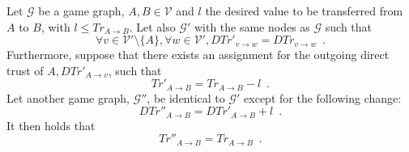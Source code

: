 {}
\begin{theorem}
\label{riskinv}
  Let $\mathcal{G}$ be a game graph, $A, B \in \mathcal{V}$ and $l$ the desired value to be transferred from $A$ to $B$, with
  $l \leq Tr_{A \rightarrow B}$. Let also $\mathcal{G}'$ with the same nodes as $\mathcal{G}$ such that
  \begin{equation*}
    \forall v \in \mathcal{V}' \setminus \{A\}, \forall w \in \mathcal{V}', DTr'_{v \rightarrow w} =
    DTr_{v \rightarrow w} \enspace.
  \end{equation*}
  Furthermore, suppose that there exists an assignment for the outgoing direct trust of $A, DTr'_{A \rightarrow v}$, such
  that
  \begin{equation}
  \label{primetrust}
    Tr'_{A \rightarrow B} = Tr_{A \rightarrow B} - l \enspace.
  \end{equation}
  Let another game graph, $\mathcal{G}''$, be identical to $\mathcal{G}'$ except for the following change:
  \begin{equation*}
    DTr''_{A \rightarrow B} = DTr'_{A \rightarrow B} + l \enspace.
  \end{equation*}
  It then holds that
  \begin{equation*}
    Tr''_{A \rightarrow B} = Tr_{A \rightarrow B} \enspace.
  \end{equation*}
\end{theorem}
